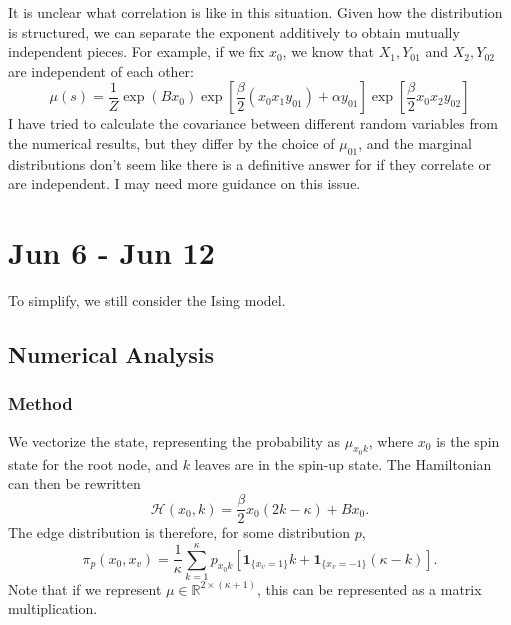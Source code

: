 \documentclass[12pt]{article}
\begin{document}
It is unclear what correlation is like in this situation. Given how the distribution is structured, we can separate the exponent additively to obtain
mutually independent pieces. For example, if we fix $x_0$, we know that $X_1, Y_{01}$ and $X_2, Y_{02}$ are independent of each other:
\begin{equation*}
    \mu(s) = \frac1Z \exp(Bx_0) \exp\left[\frac{\beta}{2}(x_0x_1y_{01}) + \alpha y_{01}\right] \exp\left[ \frac\beta2 x_0x_2y_{02}\right]
\end{equation*}
I have tried to calculate the covariance between different random variables from the numerical results, but they differ by the choice of $\mu_{01}$,
and the marginal distributions don't seem like there is a definitive answer for if they correlate or are independent. I may need more guidance on this
issue.

\newpage

\section{Jun 6 - Jun 12}

To simplify, we still consider the Ising model.

\subsection{Numerical Analysis}

\subsubsection{Method}

We vectorize the state, representing the probability as $\mu_{x_0k}$, where $x_0$ is the spin state for the root node, and $k$ leaves
are in the spin-up state. The Hamiltonian can then be rewritten
\begin{equation*}
    \mathcal{H}(x_0, k) = \frac{\beta}{2}x_0(2k-\kappa) + Bx_0.
\end{equation*}
The edge distribution is therefore, for some distribution $p$,
\begin{equation*}
    \pi_p(x_0, x_v)=\frac1\kappa\sum_{k=1}^\kappa p_{x_0k}\left[\mathbf{1}_{\{x_v=1\}}k + \mathbf{1}_{\{x_v=-1\}}(\kappa-k)\right].
\end{equation*}
Note that if we represent $\mu\in\mathbb{R}^{2\times {(\kappa+1)}}$, this can be represented as a matrix multiplication.
\end{document}
